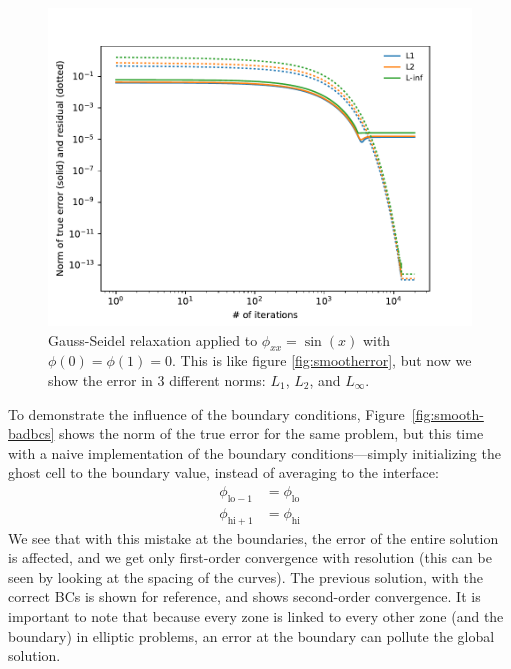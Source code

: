 \begin{figure}
\centering
\includegraphics[width=\linewidth]{smooth-error-norms}
\caption[Convergence of smoothing in different norms]{\label{fig:smoothnorms} 
  Gauss-Seidel relaxation applied to $\phi_{xx} = \sin(x)$ with
  $\phi(0) = \phi(1) = 0$.  This is like figure \ref{fig:smootherror}, but
  now we show the error in 3 different norms: $L_1$, $L_2$, and $L_\infty$.
  \\ }
\end{figure}

To demonstrate the influence of the boundary conditions,
Figure~\ref{fig:smooth-badbcs} shows the norm of the true error for
the same problem, but this time with a naive implementation of the
boundary conditions---simply initializing the ghost cell to the
boundary value, instead of averaging to the interface:
\begin{align}
\phi_\mathrm{lo-1} &= \phi_\mathrm{lo} \\
\phi_\mathrm{hi+1} &= \phi_\mathrm{hi} 
\end{align}
We see that with this mistake at the boundaries, the error of the
entire solution is affected, and we get only first-order convergence
with resolution (this can be seen by looking at the spacing of the
curves).  The previous solution, with the correct BCs is shown for
reference, and shows second-order convergence.  It is important to
note that because every zone is linked to every other zone (and the
boundary) in elliptic problems, an error at the boundary can pollute the
global solution.


